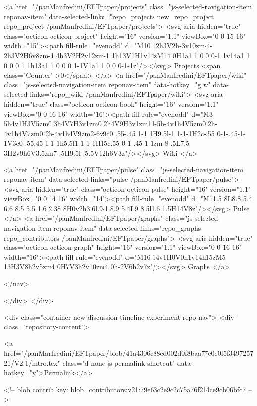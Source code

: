     <a href="/panManfredini/EFTpaper/projects" class="js-selected-navigation-item reponav-item" data-selected-links="repo_projects new_repo_project repo_project /panManfredini/EFTpaper/projects">
      <svg aria-hidden="true" class="octicon octicon-project" height="16" version="1.1" viewBox="0 0 15 16" width="15"><path fill-rule="evenodd" d="M10 12h3V2h-3v10zm-4-2h3V2H6v8zm-4 4h3V2H2v12zm-1 1h13V1H1v14zM14 0H1a1 1 0 0 0-1 1v14a1 1 0 0 0 1 1h13a1 1 0 0 0 1-1V1a1 1 0 0 0-1-1z"/></svg>
      Projects
      <span class="Counter" >0</span>
</a>
    <a href="/panManfredini/EFTpaper/wiki" class="js-selected-navigation-item reponav-item" data-hotkey="g w" data-selected-links="repo_wiki /panManfredini/EFTpaper/wiki">
      <svg aria-hidden="true" class="octicon octicon-book" height="16" version="1.1" viewBox="0 0 16 16" width="16"><path fill-rule="evenodd" d="M3 5h4v1H3V5zm0 3h4V7H3v1zm0 2h4V9H3v1zm11-5h-4v1h4V5zm0 2h-4v1h4V7zm0 2h-4v1h4V9zm2-6v9c0 .55-.45 1-1 1H9.5l-1 1-1-1H2c-.55 0-1-.45-1-1V3c0-.55.45-1 1-1h5.5l1 1 1-1H15c.55 0 1 .45 1 1zm-8 .5L7.5 3H2v9h6V3.5zm7-.5H9.5l-.5.5V12h6V3z"/></svg>
      Wiki
</a>

  <a href="/panManfredini/EFTpaper/pulse" class="js-selected-navigation-item reponav-item" data-selected-links="pulse /panManfredini/EFTpaper/pulse">
    <svg aria-hidden="true" class="octicon octicon-pulse" height="16" version="1.1" viewBox="0 0 14 16" width="14"><path fill-rule="evenodd" d="M11.5 8L8.8 5.4 6.6 8.5 5.5 1.6 2.38 8H0v2h3.6l.9-1.8.9 5.4L9 8.5l1.6 1.5H14V8z"/></svg>
    Pulse
</a>
  <a href="/panManfredini/EFTpaper/graphs" class="js-selected-navigation-item reponav-item" data-selected-links="repo_graphs repo_contributors /panManfredini/EFTpaper/graphs">
    <svg aria-hidden="true" class="octicon octicon-graph" height="16" version="1.1" viewBox="0 0 16 16" width="16"><path fill-rule="evenodd" d="M16 14v1H0V0h1v14h15zM5 13H3V8h2v5zm4 0H7V3h2v10zm4 0h-2V6h2v7z"/></svg>
    Graphs
</a>

</nav>

    </div>
  </div>

<div class="container new-discussion-timeline experiment-repo-nav">
  <div class="repository-content">

    
          

<a href="/panManfredini/EFTpaper/blob/41a4306c88ed002d0f8baa77c0e0f5f349725721/V2.1/intro.tex" class="d-none js-permalink-shortcut" data-hotkey="y">Permalink</a>

<!-- blob contrib key: blob_contributors:v21:79e63c2e9c2c75a76f214ce9cb06bfc7 -->

